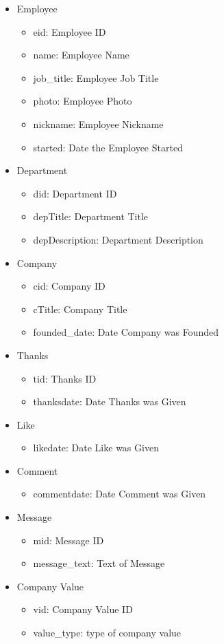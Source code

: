 \documentclass[11pt]{report}
\begin{document}
\begin{itemize}
\item Employee
    \begin{itemize}
    \item eid: Employee ID
    \item name: Employee Name
    \item job\_title: Employee Job Title
    \item photo: Employee Photo
    \item nickname: Employee Nickname
    \item started: Date the Employee Started
    \end{itemize}
\item Department
    \begin{itemize}
    \item did: Department ID
    \item depTitle: Department Title
    \item depDescription: Department Description
    \end{itemize}
\item Company
    \begin{itemize}
    \item cid: Company ID
    \item cTitle: Company Title
    \item founded\_date: Date Company was Founded
    \end{itemize}
\item Thanks
    \begin{itemize}
    \item tid: Thanks ID
    \item thanksdate: Date Thanks was Given
    \end{itemize}
\item Like
    \begin{itemize}
    \item likedate: Date Like was Given
    \end{itemize}
\item Comment
    \begin{itemize}
    \item commentdate: Date Comment was Given
    \end{itemize}
\item Message
    \begin{itemize}
    \item mid: Message ID
    \item message\_text: Text of Message
    \end{itemize}
\item Company Value
    \begin{itemize}
    \item vid: Company Value ID
    \item value\_type: type of company value
    \end{itemize}
\end{itemize}
\clearpage
\end{document}
